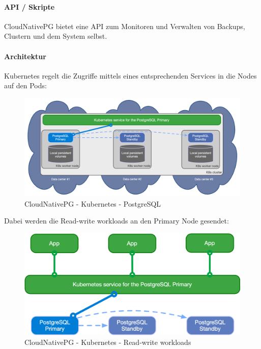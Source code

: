 \begin{flushleft}
    \paragraph{API / Skripte}
    CloudNativePG bietet eine API zum Monitoren und Verwalten von Backups, Clustern und dem System selbst\cite{LY8V4XQM}.
\end{flushleft}
\begin{flushleft}
    \paragraph{Architektur}
    Kubernetes regelt die Zugriffe mittels eines entsprechenden Services in die Nodes auf den Pods:
    \begin{figure}[H]
        \centering
        \includegraphics[width=0.75\linewidth]{source/implementation/evaluation/postgresql_ha_solutions/cloudnativepg/k8s-pg-architecture}
        \caption{CloudNativePG - Kubernetes - PostgreSQL}
        \label{fig:k8s-pg-architecture}
    \end{figure}
\end{flushleft}
\begin{flushleft}
    Dabei werden die Read-write workloads an den Primary Node gesendet:
    \begin{figure}[H]
        \centering
        \includegraphics[width=0.75\linewidth]{source/implementation/evaluation/postgresql_ha_solutions/cloudnativepg/cloudnativepg-architecture-rw}
        \caption{CloudNativePG - Kubernetes - Read-write workloads}
        \label{fig:cloudnativepg-architecture-rw}
    \end{figure}
\end{flushleft}
